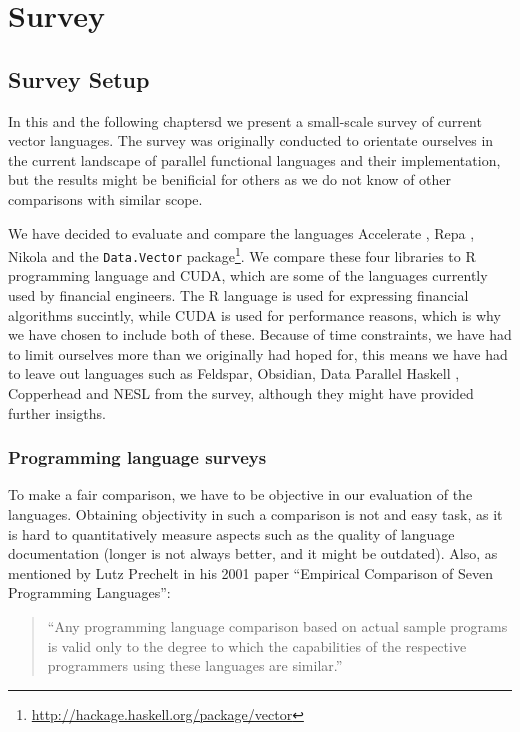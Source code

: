 \part{Survey}
\chapter{Survey Setup}
In this and the following chaptersd we present a small-scale survey of
current vector languages. The survey was originally conducted to
orientate ourselves in the current landscape of parallel functional
languages and their implementation, but the results might be
benificial for others as we do not know of other comparisons with
similar scope.

We have decided to evaluate and compare the languages Accelerate
\cite{chakravarty2011accelerating}, Repa \cite{keller2010regular},
Nikola \cite{mainland2010nikola} and the \texttt{Data.Vector}
package\footnote{\url{http://hackage.haskell.org/package/vector}}. We
compare these four libraries to R programming language  and
CUDA, which are some of the languages currently used by financial
engineers. The R language is used for expressing financial algorithms
succintly, while CUDA is used for performance reasons, which is why we
have chosen to include both of these. Because of time constraints, we
have had to limit ourselves more than we originally had hoped for,
this means we have had to leave out languages such as
Feldspar\cite{axelsson2010feldspar},
Obsidian\cite{svensson2011obsidian}, Data Parallel Haskell \cite{},
Copperhead\cite{Catanzaro2011} and NESL\cite{nesl} from the survey, although they
might have provided further insigths.


\section{Programming language surveys}
To make a fair comparison, we have to be objective in our evaluation
of the languages. Obtaining objectivity in such a comparison is not
and easy task, as it is hard to quantitatively measure aspects such as
the quality of language documentation (longer is not always better,
and it might be outdated). Also, as mentioned by Lutz Prechelt in his
2001 paper ``Empirical Comparison of Seven Programming Languages'':

\begin{quote}
  ``Any programming language comparison based on actual sample programs
  is valid only to the degree to which the capabilities of the
  respective programmers using these languages are similar.''
\end{quote}

